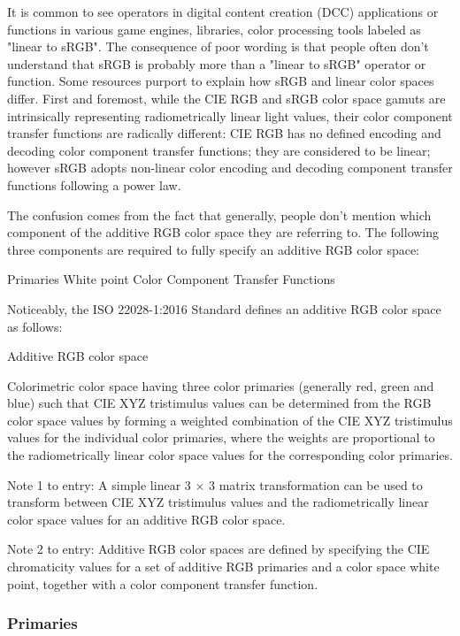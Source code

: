 It is common to see operators in digital content creation (DCC) applications or functions in various game engines, libraries, color processing tools labeled as "linear to sRGB". The consequence of poor wording is that people often don't understand that sRGB is probably more than a "linear to sRGB" operator or function. Some resources purport to explain how sRGB and linear color spaces differ.
First and foremost, while the CIE RGB and sRGB color space gamuts are intrinsically representing radiometrically linear light values, their color component transfer functions are radically different: CIE RGB has no defined encoding and decoding color component transfer functions; they are considered to be linear; however sRGB adopts non-linear color encoding and decoding component transfer functions following a power law.

The confusion comes from the fact that generally, people don't mention which component of the additive RGB color space they are referring to. The following three components are required to fully specify an additive RGB color space:

Primaries
White point
Color Component Transfer Functions

Noticeably, the ISO 22028-1:2016 Standard defines an additive RGB color space as follows:

	Additive RGB color space

Colorimetric color space having three color primaries (generally red, green and blue) such that CIE XYZ tristimulus values can be determined from the RGB color space values by forming a weighted combination of the CIE XYZ tristimulus values for the individual color primaries, where the weights are proportional to the radiometrically linear color space values for the corresponding color primaries.

Note 1 to entry: A simple linear 3 × 3 matrix transformation can be used to transform between CIE XYZ tristimulus values and the radiometrically linear color space values for an additive RGB color space.

Note 2 to entry: Additive RGB color spaces are defined by specifying the CIE chromaticity values for a set of additive RGB primaries and a color space white point, together with a color component transfer function.

\subsubsection{Primaries}%
\label{subsubsec:primaries}

